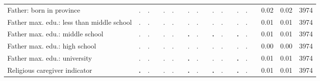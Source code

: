 \begin{tabular}{l c c c c c c c c c c c c c c c c c c}
Father: born in province &         . &         . & &         . &         . & &         . &         . & &         . &         . & &         . &         . & &      0.02 &      0.02 &      3974 \\
Father max. edu.: less than middle school &         . &         . & &         . &         . & &         . &         . & &         . &         . & &         . &         . & &      0.01 &      0.01 &      3974 \\
Father max. edu.: middle school &         . &         . & &         . &         . & & \textbf{        .} &         . & & \textbf{        .} &         . & & \textbf{        .} &         . & &      0.01 &      0.01 &      3974 \\
Father max. edu.: high school &         . &         . & &         . &         . & &         . &         . & &         . &         . & &         . &         . & &      0.00 &      0.00 &      3974 \\
Father max. edu.: university &         . &         . & &         . &         . & & \textbf{        .} &         . & &         . &         . & & \textbf{        .} &         . & &      0.01 &      0.01 &      3974 \\
Religious caregiver indicator & \textbf{        .} &         . & &         . &         . & & \textbf{        .} &         . & & \textbf{        .} &         . & & \textbf{        .} &         . & &      0.01 &      0.01 &      3974 \\
\bottomrule
\end{tabular}
